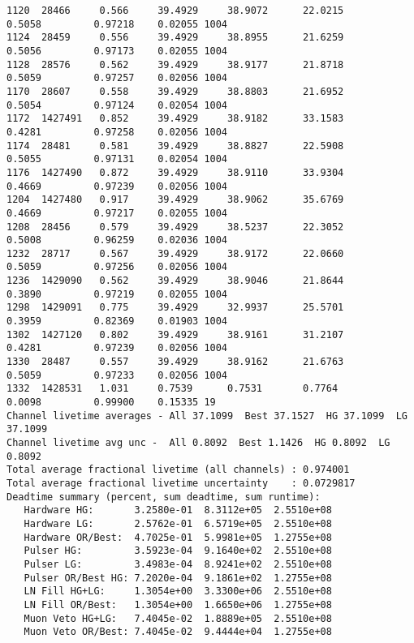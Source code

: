 \documentclass[notitlepage,rmp,aps,10pt]{revtex4-1}
\begin{document}
\begin{verbatim}
1120  28466     0.566     39.4929     38.9072      22.0215        0.5058         0.97218    0.02055 1004
1124  28459     0.556     39.4929     38.8955      21.6259        0.5056         0.97173    0.02055 1004
1128  28576     0.562     39.4929     38.9177      21.8718        0.5059         0.97257    0.02056 1004
1170  28607     0.558     39.4929     38.8803      21.6952        0.5054         0.97124    0.02054 1004
1172  1427491   0.852     39.4929     38.9182      33.1583        0.4281         0.97258    0.02056 1004
1174  28481     0.581     39.4929     38.8827      22.5908        0.5055         0.97131    0.02054 1004
1176  1427490   0.872     39.4929     38.9110      33.9304        0.4669         0.97239    0.02056 1004
1204  1427480   0.917     39.4929     38.9062      35.6769        0.4669         0.97217    0.02055 1004
1208  28456     0.579     39.4929     38.5237      22.3052        0.5008         0.96259    0.02036 1004
1232  28717     0.567     39.4929     38.9172      22.0660        0.5059         0.97256    0.02056 1004
1236  1429090   0.562     39.4929     38.9046      21.8644        0.3890         0.97219    0.02055 1004
1298  1429091   0.775     39.4929     32.9937      25.5701        0.3959         0.82369    0.01903 1004
1302  1427120   0.802     39.4929     38.9161      31.2107        0.4281         0.97239    0.02056 1004
1330  28487     0.557     39.4929     38.9162      21.6763        0.5059         0.97233    0.02056 1004
1332  1428531   1.031     0.7539      0.7531       0.7764         0.0098         0.99900    0.15335 19
Channel livetime averages - All 37.1099  Best 37.1527  HG 37.1099  LG 37.1099
Channel livetime avg unc -  All 0.8092  Best 1.1426  HG 0.8092  LG 0.8092
Total average fractional livetime (all channels) : 0.974001
Total average fractional livetime uncertainty    : 0.0729817
Deadtime summary (percent, sum deadtime, sum runtime):
   Hardware HG:       3.2580e-01  8.3112e+05  2.5510e+08
   Hardware LG:       2.5762e-01  6.5719e+05  2.5510e+08
   Hardware OR/Best:  4.7025e-01  5.9981e+05  1.2755e+08
   Pulser HG:         3.5923e-04  9.1640e+02  2.5510e+08
   Pulser LG:         3.4983e-04  8.9241e+02  2.5510e+08
   Pulser OR/Best HG: 7.2020e-04  9.1861e+02  1.2755e+08
   LN Fill HG+LG:     1.3054e+00  3.3300e+06  2.5510e+08
   LN Fill OR/Best:   1.3054e+00  1.6650e+06  1.2755e+08
   Muon Veto HG+LG:   7.4045e-02  1.8889e+05  2.5510e+08
   Muon Veto OR/Best: 7.4045e-02  9.4444e+04  1.2755e+08


\end{verbatim}
\end{document}
